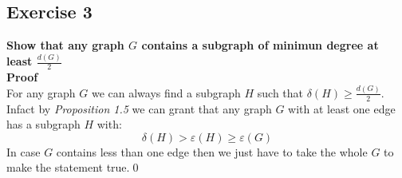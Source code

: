 \subsection*{Exercise 3}
\boldmath
\textbf{Show that any graph $G$ contains a subgraph of minimun degree at least $\frac{d(G)}{2}$\\\linebreak 
Proof\\}
\unboldmath
For any graph $G$ we can always find a subgraph $H$ such that $\delta(H) \geq \frac{d(G)}{2}$. Infact by \textit{Proposition 1.5} we can grant that any graph $G$ with at least one edge has a subgraph $H$ with:
\begin{equation*}
    \delta(H) > \varepsilon(H) \geq \varepsilon(G)
\end{equation*}
In case $G$ contains less than one edge then we just have to take the whole $G$ to make the statement true.\qed